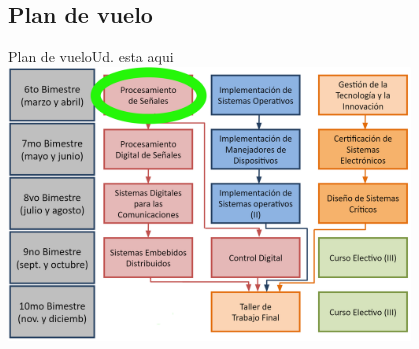  \subsection{Plan de vuelo}
 \begin{frame}{Plan de vuelo}{Ud. esta aqui}
    \center\includegraphics[width=0.8\textwidth]{1_clase/Esquema_MSE}
    \vfill
 \end{frame}
